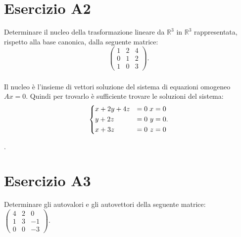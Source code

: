 \documentclass[a4paper]{report}
\newenvironment{problem}
        {
                \begin{mdframed}[topline=false,rightline=false,bottomline=false]
                        \slshape
        }
        {
                \end{mdframed}
        }
\begin{document}
        \chapter*{Esercizio A2}
        \begin{problem}
                Determinare il nucleo della trasformazione lineare da $\mathbb{R}^3$ in $\mathbb{R}^3$ rappresentata, rispetto alla base canonica, dalla seguente matrice:
                \[
                        \begin{pmatrix}
                               1 & 2 & 4 \\
                               0 & 1 & 2 \\
                               1 & 0 & 3
                        \end{pmatrix}.
                \]
        \end{problem}

        \paragraph{}
        Il nucleo \`{e} l'insieme di vettori soluzione del sistema di equazioni omogeneo $Ax = 0$.
        Quindi per trovarlo \`{e} sufficiente trovare le soluzioni del sistema:
        \[
                \begin{dcases}
                        x + 2y + 4z & = 0 \\
                        y + 2z      & = 0 \\
                        x + 3z      & = 0
                \end{dcases}
                \begin{aligned}
                        x  & = 0 \\
                        y  & = 0 \\
                        z  & = 0
                \end{aligned}.
        \]

        .


        \chapter*{Esercizio A3}
        \begin{problem}
                Determinare gli autovalori e gli autovettori della seguente matrice:
                $
                        \begin{pmatrix}
                                4 & 2 & 0 \\
                                1 & 3 & -1 \\
                                0 & 0 & -3
                        \end{pmatrix}.
                $
        \end{problem}
\end{document}
